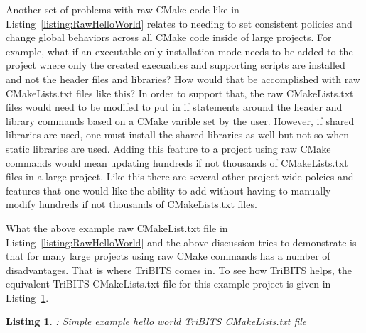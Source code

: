 \documentclass[10pt]{article}
\newtheorem{listing}{Listing}
\begin{document}
Another set of problems with raw CMake code like in Listing~\ref{listing:RawHelloWorld} relates to needing to set consistent policies and change global behaviors across all CMake code inside of large projects.  For example, what if an executable-only installation mode needs to be added to the project where only the created execuables and supporting scripts are installed and not the header files and libraries?  How would that be accomplished with raw CMakeLists.txt files like this?  In order to support that, the raw CMakeLists.txt files would need to be modifed to put in if statements around the header and library  commands based on a CMake varible set by the user.  However, if shared libraries are used, one must install the shared libraries as well but not so when static libraries are used.  Adding this feature to a project using raw CMake commands would mean updating hundreds if not thousands of CMakeLists.txt files in a large project.  Like this there are several other project-wide polcies and features that one would like the ability to add without having to manually modify hundreds if not thousands of CMakeLists.txt files.

What the above example raw CMakeList.txt file in Listing~\ref{listing:RawHelloWorld} and the above discussion tries to demonstrate is that for many large projects using raw CMake commands has a number of disadvantages.  That is where TriBITS comes in.  To see how TriBITS helps, the equivalent TriBITS CMakeLists.txt file for this example project is given in Listing~\ref{listing:TribitsHelloWorld}.

\begin{listing}: Simple example hello world TriBITS CMakeLists.txt file
\label{listing:TribitsHelloWorld}
{\small

}
\end{listing}
\end{document}
